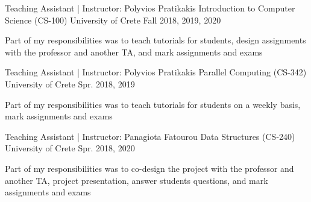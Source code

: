 


\begin{cventries}

  \cventry
    {Teaching Assistant | Instructor: Polyvios Pratikakis} %
    {Introduction to Computer Science (CS-100)} %
    {University of Crete} %
    {Fall 2018, 2019, 2020} %
    {
      \begin{cvitems} %
        \item{Part of my responsibilities was to teach tutorials for
            students, design assignments with the professor and
              another TA, and mark assignments and exams}
      \end{cvitems}
    }

  \cventry
    {Teaching Assistant | Instructor: Polyvios Pratikakis} %
    {Parallel Computing (CS-342)} %
    {University of Crete} %
    {Spr. 2018, 2019} %
    {
      \begin{cvitems} %
        \item{Part of my responsibilities was to teach tutorials for
            students on a weekly basis, mark assignments and exams}
      \end{cvitems}
    }

  \cventry
    {Teaching Assistant | Instructor: Panagiota Fatourou} %
    {Data Structures (CS-240)} %
    {University of Crete} %
    {Spr. 2018, 2020} %
    {
      \begin{cvitems} %
        \item{Part of my responsibilities was to co-design the project
            with the professor and another TA, project presentation,
              answer students questions, and mark assignments and
              exams}
      \end{cvitems}
    }


\end{cventries}
